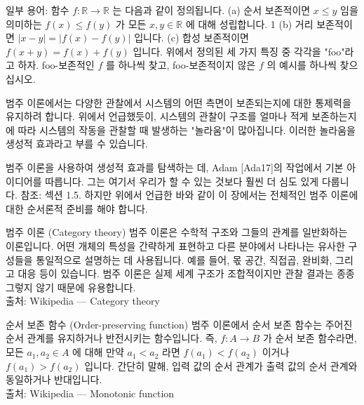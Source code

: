 \documentclass[11pt, a4paper, twoside, openany]{book}
\begin{document}
\par\medskip
\begin{exercisebox}[연습문제 1.1.]
일부 용어: 함수 $f: \mathbb{R} \rightarrow \mathbb{R}$ 는 다음과 같이 정의됩니다.
(a) 순서 보존적이면 $x \leq y$ 임을 의미하는 $f(x) \leq f(y)$ 가 모든 $x, y \in \mathbb{R}$ 에 대해 성립합니다. 1
(b) 거리 보존적이면 $|x - y| = |f(x) - f(y)|$ 입니다.
(c) 합성 보존적이면 $f(x + y) = f(x) + f(y)$ 입니다.
위에서 정의된 세 가지 특징 중 각각을 "foo"라고 하자. foo-보존적인 $f$ 를 하나씩 찾고, foo-보존적이지 않은 $f$ 의 예시를 하나씩 찾으십시오.
\end{exercisebox}

\par\medskip
범주 이론에서는 다양한 관찰에서 시스템의 어떤 측면이 보존되는지에 대한 통제력을 유지하려 합니다. 위에서 언급했듯이, 시스템의 관찰이 구조를 얼마나 적게 보존하는지에 따라 시스템의 작동을 관찰할 때 발생하는 "놀라움"이 많아집니다. 이러한 놀라움을 생성적 효과라고 부를 수 있습니다.

\par\medskip
범주 이론을 사용하여 생성적 효과를 탐색하는 데, Adam [Ada17]의 작업에서 기본 아이디어를 따릅니다. 그는 여기서 우리가 할 수 있는 것보다 훨씬 더 심도 있게 다룹니다. 참조: 섹션 1.5. 하지만 위에서 언급한 바와 같이 이 장에서는 전체적인 범주 이론에 대한 순서론적 준비를 해야 합니다.

\begin{deepresearch}{범주 이론 (Category theory)}
범주 이론은 수학적 구조와 그들의 관계를 일반화하는 이론입니다.  어떤 개체의 특성을 간략하게 표현하고 다른 분야에서 나타나는 유사한 구성들을 통일적으로 설명하는 데 사용됩니다. 예를 들어, 몫 공간, 직접곱, 완비화, 그리고 대응 등이 있습니다.  범주 이론은 실제 세계 구조가 조합적이지만 관찰 결과는 종종 그렇지 않기 때문에 유용합니다.
\\[4pt]{\footnotesize\color{ctgray} 출처: Wikipedia — Category theory}
\end{deepresearch}

\begin{deepresearch}{순서 보존 함수 (Order-preserving function)}
범주 이론에서 순서 보존 함수는 주어진 순서 관계를 유지하거나 반전시키는 함수입니다.  즉, $f : A \to B$ 가 순서 보존 함수라면, 모든 $a_1, a_2 \in A$ 에 대해 만약 $a_1 < a_2$ 라면 $f(a_1) < f(a_2)$ 이거나 $f(a_1) > f(a_2)$ 입니다.  간단히 말해, 입력 값의 순서 관계가 출력 값의 순서 관계와 동일하거나 반대입니다.
\\[4pt]{\footnotesize\color{ctgray} 출처: Wikipedia — Monotonic function}
\end{deepresearch}
\end{document}
